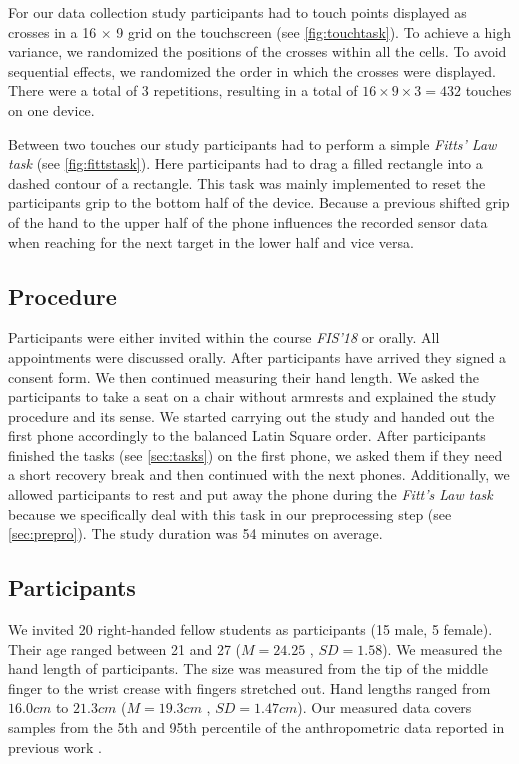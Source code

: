


For our data collection study participants had to touch points displayed as crosses in a 16 $ \times $ 9 grid on the touchscreen (see \cref{fig:touchtask}). 
To achieve a high variance, we randomized the positions of the crosses within all the cells.
To avoid sequential effects, we randomized the order in which the crosses were displayed.
There were a total of 3 repetitions, resulting in a total  of $ 16 \times 9 \times 3 = 432 $ touches on one device.

Between two touches our study participants had to perform a simple \textit{Fitts' Law task} (see \cref{fig:fittstask}). 
Here participants had to drag a filled rectangle into a dashed contour of a rectangle.
This task was mainly implemented to reset the participants grip to the bottom half of the device.
Because a previous shifted grip of the hand to the upper half of the phone influences the recorded sensor data when reaching for the next target in the lower half and vice versa.
\subsection{Procedure}
Participants were either invited within the course \textit{FIS'18} or orally.
All appointments were discussed orally.
After participants have arrived they signed a consent form. 
We then continued measuring their hand length.
We asked the participants to take a seat on a chair without armrests and explained the study procedure and its sense.
We started carrying out the study and handed out the first phone accordingly to the balanced Latin Square order. 
After participants finished the tasks (see \cref{sec:tasks}) on the first phone, we asked them if they need a short recovery break and then continued with the next phones.
Additionally, we allowed participants to rest and put away the phone during the \textit{Fitt's Law task} because we specifically deal with this task in our preprocessing step (see \cref{sec:prepro}).
The study duration was 54 minutes on average.
\subsection{Participants}
We invited 20 right-handed fellow students as participants (15 male, 5 female).
Their age ranged between 21 and 27 ($ M=24.25$ , $SD=1.58 $). 
We measured the hand length of participants. 
The size was measured from the tip of the middle finger to the wrist crease with fingers stretched out.
Hand lengths ranged from $16.0cm$ to $21.3cm$ ($M=19.3cm$ , $SD=1.47cm$).
Our measured data covers samples from the 5th and 95th percentile of the anthropometric data reported in previous work \cite{Poston}.  
